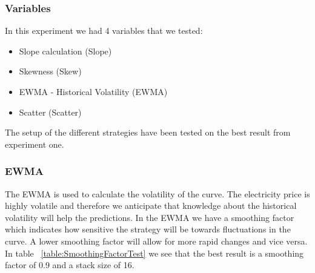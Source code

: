 \subsubsection{Variables}
In this experiment we had 4 variables that we tested:
\begin{itemize}
	\item Slope calculation (Slope)
	\item Skewness (Skew)
	\item EWMA - Historical Volatility (EWMA)
	\item Scatter (Scatter)
\end{itemize}

The setup of the different strategies have been tested on the best result from experiment one.

\subsubsection{EWMA}
The EWMA is used to calculate the volatility of the curve. The electricity price is highly volatile and therefore we anticipate that knowledge about the historical volatility will help the predictions. In the EWMA we have a smoothing factor which indicates how sensitive the strategy will be towards fluctuations in the curve. A lower smoothing factor will allow for more rapid changes and vice versa. In table ~\ref{table:SmoothingFactorTest} we see that the best result is a smoothing factor of 0.9 and a stack size of 16.

\begin{table}[H]
\centering  %
\caption{Smoothing factor test} %
\label{table:SmoothingFactorTest} %
\end{table}

